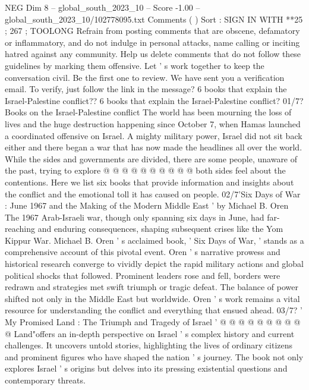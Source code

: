 \begin{textsample}{NEG Dim 8 – global\_south\_2023\_10 – Score -1.00 – global\_south\_2023\_10/102778095.txt}  \label{ex:f8_neg_091}
Comments ( ) Sort : SIGN IN WITH **25 ; 267 ; TOOLONG Refrain from posting comments that are obscene, defamatory or inflammatory, and do not indulge in personal attacks, name calling or inciting hatred against any community.
Help us delete comments that do not follow these guidelines by marking them offensive.
Let ' s work together to keep the conversation civil.
Be the first one to review.
We have sent you a verification email.
To verify, just follow the link in the message? 6 books that explain the Israel-Palestine conflict?? 6 books that explain the Israel-Palestine conflict? 01/7?
Books on the Israel-Palestine conflict The world has been mourning the loss of lives and the huge destruction happening since October 7, when Hamas launched a coordinated offensive on Israel.
A mighty military power, Israel did not sit back either and there began a war that has now made the headlines all over the world.
While the sides and governments are divided, there are some people, unaware of the past, trying to explore @ @ @ @ @ @ @ @ @ @ both sides feel about the contentions.
Here we list six books that provide information and insights about the conflict and the emotional toll it has caused on people. 02/7'Six Days of War : June 1967 and the Making of the Modern Middle East ' by Michael B.
Oren The 1967 Arab-Israeli war, though only spanning six days in June, had far-reaching and enduring consequences, shaping subsequent crises like the Yom Kippur War.
Michael B.
Oren ' s acclaimed book, ' Six Days of War, ' stands as a comprehensive account of this pivotal event.
Oren ' s narrative prowess and historical research converge to vividly depict the rapid military actions and global political shocks that followed.
Prominent leaders rose and fell, borders were redrawn and strategies met swift triumph or tragic defeat.
The balance of power shifted not only in the Middle East but worldwide.
Oren ' s work remains a vital resource for understanding the conflict and everything that ensued ahead. 03/7? ' My Promised Land : The Triumph and Tragedy of Israel ' @ @ @ @ @ @ @ @ @ @ Land"offers an in-depth perspective on Israel ' s complex history and current challenges.
It uncovers untold stories, highlighting the lives of ordinary citizens and prominent figures who have shaped the nation ' s journey.
The book not only explores Israel ' s origins but delves into its pressing existential questions and contemporary threats.

\end{textsample}
